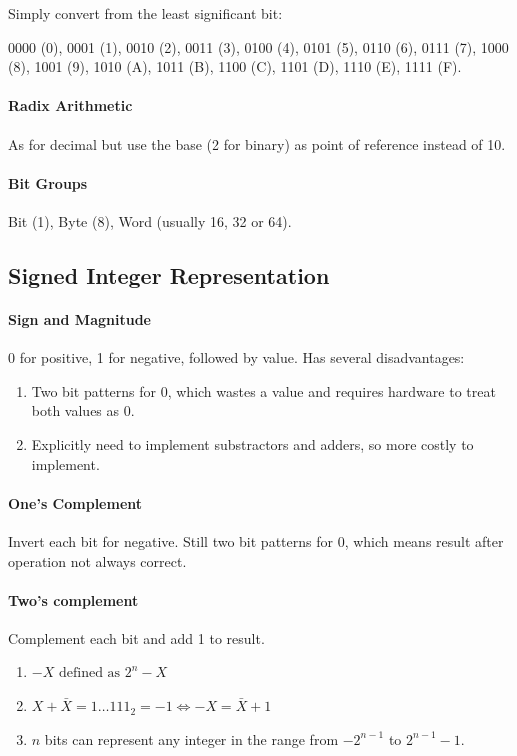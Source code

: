 \documentclass[twocolumn,english]{article}
\begin{document}
Simply convert from the least significant bit:

0000 (0), 0001 (1), 0010 (2), 0011 (3), 0100 (4), 0101 (5), 0110 (6),
0111 (7), 1000 (8), 1001 (9), 1010 (A), 1011 (B), 1100 (C), 1101 (D),
1110 (E), 1111 (F).


\paragraph{Radix Arithmetic}

As for decimal but use the base (2 for binary) as point of reference
instead of 10.


\paragraph{Bit Groups}

Bit (1), Byte (8), Word (usually 16, 32 or 64).


\subsection{Signed Integer Representation}


\paragraph{Sign and Magnitude}

0 for positive, 1 for negative, followed by value. Has several disadvantages:
\begin{enumerate}
\item Two bit patterns for 0, which wastes a value and requires hardware
to treat both values as 0.
\item Explicitly need to implement substractors and adders, so more costly
to implement.
\end{enumerate}

\paragraph{One's Complement}

Invert each bit for negative. Still two bit patterns for 0, which
means result after operation not always correct.


\paragraph{Two's complement}

Complement each bit and add 1 to result.
\begin{enumerate}
\item $-X\mbox{ defined as }2^{n}-X$
\item $X+\bar{X}=1\dots111_{2}=-1\iff-X=\bar{X}+1$
\item $n$ bits can represent any integer in the range from $-2^{n-1}$
to $2^{n-1}-1$.
\end{enumerate}
\end{document}
